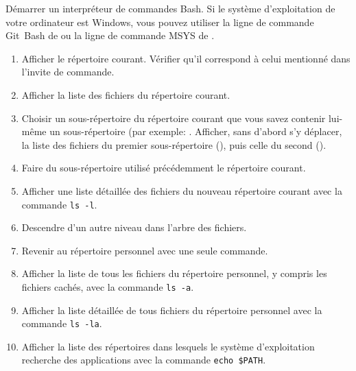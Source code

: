 \begin{exercice}[nosol]
  Démarrer un interpréteur de commandes Bash. Si le système
  d'exploitation de votre ordinateur est Windows, vous pouvez utiliser
  la ligne de commande Git~Bash de
   ou la
  ligne de commande MSYS de
  .
  \begin{enumerate}
  \item Afficher le répertoire courant. Vérifier qu'il correspond à
    celui mentionné dans l'invite de commande.
  \item Afficher la liste des fichiers du répertoire courant.
  \item Choisir un sous-répertoire du répertoire courant que vous
    savez contenir lui-même un sous-répertoire (par exemple:
    . Afficher, sans d'abord s'y déplacer, la
    liste des fichiers du premier sous-répertoire (),
    puis celle du second ().
  \item Faire du sous-répertoire utilisé précédemment le répertoire
    courant.
  \item Afficher une liste détaillée des fichiers du nouveau
    répertoire courant avec la commande \verb=ls -l=.
  \item Descendre d'un autre niveau dans l'arbre des fichiers.
  \item Revenir au répertoire personnel avec une seule commande.
  \item Afficher la liste de tous les fichiers du répertoire
    personnel, y compris les fichiers cachés, avec la commande
    \verb=ls -a=.
  \item Afficher la liste détaillée de tous fichiers du répertoire
    personnel avec la commande \verb=ls -la=.
  \item Afficher la liste des répertoires dans lesquels le système
    d'exploitation recherche des applications avec la commande
    \verb=echo $PATH=.
  \end{enumerate}
\end{exercice}


